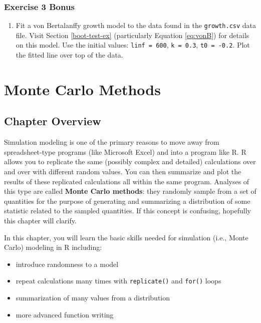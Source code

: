\documentclass[]{book}
\providecommand{\tightlist}{%
  \setlength{\itemsep}{0pt}\setlength{\parskip}{0pt}}
\begin{document}
\hypertarget{exercise-3-bonus}{%
\subsection*{Exercise 3 Bonus}\label{exercise-3-bonus}}

\begin{enumerate}
\def\labelenumi{\arabic{enumi}.}
\tightlist
\item
  Fit a von Bertalanffy growth model to the data found in the \texttt{growth.csv} data file. Visit Section \ref{boot-test-ex} (particularly Equation \eqref{eq:vonB}) for details on this model. Use the initial values: \texttt{linf\ =\ 600}, \texttt{k\ =\ 0.3}, \texttt{t0\ =\ -0.2}. Plot the fitted line over top of the data.
\end{enumerate}

\hypertarget{ch4}{%
\chapter{Monte Carlo Methods}\label{ch4}}

\hypertarget{chapter-overview-3}{%
\section*{Chapter Overview}\label{chapter-overview-3}}

Simulation modeling is one of the primary reasons to move away from spreadsheet-type programs (like Microsoft Excel) and into a program like R. R allows you to replicate the same (possibly complex and detailed) calculations over and over with different random values. You can then summarize and plot the results of these replicated calculations all within the same program. Analyses of this type are called \textbf{Monte Carlo methods}: they randomly sample from a set of quantities for the purpose of generating and summarizing a distribution of some statistic related to the sampled quantities. If this concept is confusing, hopefully this chapter will clarify.

In this chapter, you will learn the basic skills needed for simulation (i.e., Monte Carlo) modeling in R including:

\begin{itemize}
\tightlist
\item
  introduce randomness to a model
\item
  repeat calculations many times with \texttt{replicate()} and \texttt{for()} loops
\item
  summarization of many values from a distribution
\item
  more advanced function writing
\end{itemize}
\end{document}
